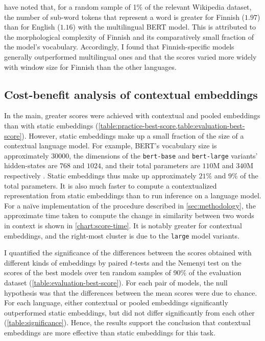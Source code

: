 

\textcites[3]{Virtanen2019} have noted that, for a random sample of 1\% of the relevant
Wikipedia dataset, the number of sub-word tokens that represent a word
is greater for Finnish ($1.97$) than for English ($1.16$) with the multilingual BERT model.
This is attributed to the morphological complexity of Finnish and its comparatively
small fraction of the model's vocabulary.
Accordingly, I found that Finnish-specific models generally outperformed multilingual
ones and that the scores varied more widely with window size for Finnish than the other
languages.

\newpage

\subsection{Cost-benefit analysis of contextual embeddings}
\label{sec:cost-benefit}





In the main, greater scores were achieved with contextual and pooled embeddings than
with static embeddings (\cref{table:practice-best-score,table:evaluation-best-score}).
However, static embeddings make up a small fraction of the size of a contextual
language model.
For example, BERT's vocabulary size is approximately $30000$, the dimensions of the
\texttt{bert-base} and \texttt{bert-large} variants' hidden-states are $768$ and
$1024$, and their total parameters are $110$M and $340$M respectively
\parencites[4173-4174]{Devlin2019}.
Static embeddings thus make up approximately $21$\% and $9$\% of the total parameters.
It is also much faster to compute a contextualized representation from static
embeddings than to run inference on a language model.
For a naïve implementation of the procedure described in \cref{sec:methodology}, the
approximate time taken to compute the change in similarity between two words in context
is shown in \cref{chart:score-time}.
It is notably greater for contextual embeddings, and the right-most cluster is due to
the \texttt{large} model variants.



I quantified the significance of the differences between the scores obtained with
different kinds of embeddings by paired $t$-tests and the Nemenyi test
\parencites{Demsar2006} on the scores of the best models over ten random samples of
90\% of the evaluation dataset (\cref{table:evaluation-best-score}).
For each pair of models, the null hypothesis was that the differences between the mean
scores were due to chance.
For each language, either contextual or pooled embeddings significantly outperformed
static embeddings, but did not differ significantly from each other
(\cref{table:significance}).
Hence, the results support the conclusion that contextual embeddings are more effective
than static embeddings for this task.

